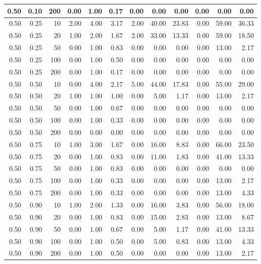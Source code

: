 \documentclass{bmstu}
\begin{document}
\begin{longtable}{|r|r|r|r|r|r|r|r|r|r|r|r|}
0.50 & 0.10 & 200 & 0.00 & 1.00 & 0.17 & 0.00 & 0.00 & 0.00 & 0.00 & 0.00 & 0.00  \\
\hline
0.50 & 0.25 & 10 & 2.00 & 4.00 & 3.17 & 2.00 & 40.00 & 23.83 & 0.00 & 59.00 & 36.33  \\
0.50 & 0.25 & 20 & 1.00 & 2.00 & 1.67 & 2.00 & 33.00 & 13.33 & 0.00 & 59.00 & 18.50  \\
0.50 & 0.25 & 50 & 0.00 & 1.00 & 0.83 & 0.00 & 0.00 & 0.00 & 0.00 & 13.00 & 2.17  \\
0.50 & 0.25 & 100 & 0.00 & 1.00 & 0.50 & 0.00 & 0.00 & 0.00 & 0.00 & 0.00 & 0.00  \\
0.50 & 0.25 & 200 & 0.00 & 1.00 & 0.17 & 0.00 & 0.00 & 0.00 & 0.00 & 0.00 & 0.00  \\
\hline
0.50 & 0.50 & 10 & 0.00 & 4.00 & 2.17 & 5.00 & 44.00 & 17.83 & 0.00 & 55.00 & 29.00  \\
0.50 & 0.50 & 20 & 1.00 & 1.00 & 1.00 & 0.00 & 5.00 & 1.17 & 0.00 & 13.00 & 2.17  \\
0.50 & 0.50 & 50 & 0.00 & 1.00 & 0.67 & 0.00 & 0.00 & 0.00 & 0.00 & 0.00 & 0.00  \\
0.50 & 0.50 & 100 & 0.00 & 1.00 & 0.33 & 0.00 & 0.00 & 0.00 & 0.00 & 0.00 & 0.00  \\
0.50 & 0.50 & 200 & 0.00 & 0.00 & 0.00 & 0.00 & 0.00 & 0.00 & 0.00 & 0.00 & 0.00  \\
\hline
0.50 & 0.75 & 10 & 1.00 & 3.00 & 1.67 & 0.00 & 16.00 & 8.83 & 0.00 & 66.00 & 23.50  \\
0.50 & 0.75 & 20 & 0.00 & 1.00 & 0.83 & 0.00 & 11.00 & 1.83 & 0.00 & 41.00 & 13.33  \\
0.50 & 0.75 & 50 & 0.00 & 1.00 & 0.83 & 0.00 & 0.00 & 0.00 & 0.00 & 0.00 & 0.00  \\
0.50 & 0.75 & 100 & 0.00 & 1.00 & 0.33 & 0.00 & 0.00 & 0.00 & 0.00 & 13.00 & 2.17  \\
0.50 & 0.75 & 200 & 0.00 & 1.00 & 0.33 & 0.00 & 0.00 & 0.00 & 0.00 & 13.00 & 4.33  \\
\hline
0.50 & 0.90 & 10 & 1.00 & 2.00 & 1.33 & 0.00 & 16.00 & 3.83 & 0.00 & 56.00 & 18.00  \\
0.50 & 0.90 & 20 & 0.00 & 1.00 & 0.83 & 0.00 & 15.00 & 2.83 & 0.00 & 13.00 & 8.67  \\
0.50 & 0.90 & 50 & 0.00 & 1.00 & 0.67 & 0.00 & 5.00 & 1.17 & 0.00 & 41.00 & 13.33  \\
0.50 & 0.90 & 100 & 0.00 & 1.00 & 0.50 & 0.00 & 5.00 & 0.83 & 0.00 & 13.00 & 4.33  \\
0.50 & 0.90 & 200 & 0.00 & 1.00 & 0.50 & 0.00 & 0.00 & 0.00 & 0.00 & 13.00 & 2.17  \\

\end{longtable}
\end{document}
